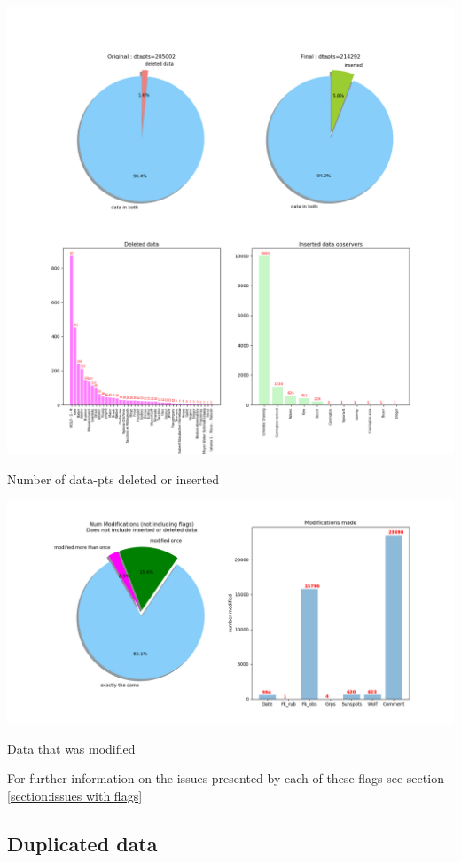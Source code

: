\documentclass[12pt]{article}
\begin{document}
{\centering
\includegraphics[width=\linewidth]{pie-charts-1-deleted-inserted.png}
\caption{Number of data-pts deleted or inserted}
\label{fig:pie chart deleted inserted}
\par}

{\centering
\includegraphics[width=\linewidth]{pie-charts-2-modified-database.png}
\caption{Data that was modified}
\label{fig:pie chart modified data}
\par}

For further information on the issues presented by each of these flags see section \ref{section:issues with flags}

\subsection{Duplicated data}\label{section:duplicated data}
\end{document}
